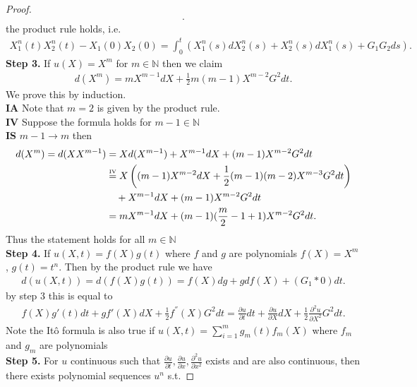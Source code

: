 \begin{proof}
\begin{align*}
  .\end{align*}
  the product rule holds, i.e. 
  \begin{align*}
    X_1^{n}(t)X_2^{n}(t) - X_1(0)X_2(0) = \int_0^{t} \left( X_1^{n}(s)dX_2^{n}(s) + X_2^{n}(s) dX_1^{n}(s) + G_{1}G_{2}ds     \right)    
  .\end{align*}
  \textbf{Step 3.} If $u(X) = X^{m} $ for $m \in  \mathbb{N}$ then we claim 
  \begin{align*}
    d(X^{m} ) = mX^{m-1}dX + \frac{1}{2}m(m-1) X^{m-2} G^2dt
  .\end{align*}
  We prove this by induction.\\
  \textbf{IA} Note that $m=2$ is given by the product rule. \\
  \textbf{IV} Suppose the formula holds for $m-1 \in  \mathbb{N}$ \\
  \textbf{IS} $m-1 \to m$ then 
  \begin{align*}
    d(X^{m} )= d(XX^{m-1} ) &= Xd(X^{m-1} ) + X^{m-1}dX + (m-1)X^{m-2} G^2dt \\
                            &\myS{IV}{=} X \left( (m-1)X^{m-2} dX + \frac{1}{2}(m-1)(m-2)X^{m-3}G^2 dt   \right) \\
                            & \quad + X^{m-1}dX + (m-1)X^{m-2}G^2 dt \\
                            &= mX^{m-1} dX + (m-1)(\frac{m}{2} -1 +1) X^{m-2} G^2 dt 
  .\end{align*}
  Thus the statement holds for all $m \in  \mathbb{N}$\\[1ex]
  \textbf{Step 4.} If $u(X,t) = f(X)g(t)$ where $f$ and $g$ are polynomials $f(X) = X^{m} $ , $g(t) =t^n$.
  Then by the product rule we have 
  \begin{align*}
    d(u(X,t)) = d(f(X)g(t)) = f(X)dg + g df(X) + (G_{1}*0) dt
  .\end{align*}
  by step 3  this is equal to
  \begin{align*}
    f(X)g'(t)dt + gf'(X)dX + \frac{1}{2}f^{''}(X)G^2 dt =\frac{\partial u}{\partial t} dt + \frac{\partial u}{\partial X} dX + \frac{1}{2} \frac{\partial ^2 u}{\partial X^2} G^2 dt
  .\end{align*}
  Note the It\^o formula is also true if $u(X,t) = \sum_{i=1}^{m} g_m(t)f_m(X) $ where $f_m$ and $g_m$ are polynomials\\[1ex]
  \textbf{Step 5.} For $u$ continuous such that $\frac{\partial u}{\partial t} , \frac{\partial u}{\partial x} ,\frac{\partial ^2 u}{\partial x^2}$ exists and are also continuous, then
  there exists polynomial sequences $u^{n} $ s.t.

\end{proof}
